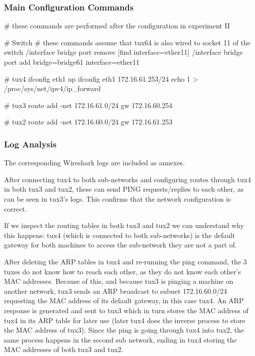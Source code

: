 \subsubsection{Main Configuration Commands}

\begin{code-bash}
# these commands are performed after the configuration in experiment II

# Switch
# these commands assume that tux64 is also wired to socket 11 of the switch
/interface bridge port remove [find interface=ether11]
/interface bridge port add bridge=bridge61 interface=ether11

# tux4
ifconfig eth1 up
ifconfig eth1 172.16.61.253/24
echo 1 > /proc/sys/net/ipv4/ip_forward

# tux3
route add -net 172.16.61.0/24 gw 172.16.60.254

# tux2
route add -net 172.16.60.0/24 gw 172.16.61.253
\end{code-bash}

\subsubsection{Log Analysis}

The corresponding Wireshark logs are included as annexes.

After connecting tux4 to both sub-networks and configuring routes through tux4 in both tux3 and tux2, these can send PING requests/replies to each other, as can be seen in tux3's logs. This confirms that the network configuration is correct.

If we inspect the routing tables in both tux3 and tux2 we can understand why this happens: tux4 (which is connected to both sub-networks) is the default gateway for both machines to access the sub-network they are not a part of.

After deleting the ARP tables in tux4 and re-running the ping command, the 3 tuxes do not know how to reach each other, as they do not know each other's MAC addresses.
Because of this, and because tux3 is pinging a machine on another network, tux3 sends an ARP broadcast to subnet 172.16.60.0/24 requesting the MAC address of its default gateway, in this case tux4.
An ARP response is generated and sent to tux3 which in turn stores the MAC address of tux4 in its ARP table for later use (later tux4 does the inverse process to store the MAC address of tux3).
Since the ping is going through tux4 into tux2, the same process happens in the second sub network, ending in tux4 storing the MAC addresses of both tux3 and tux2.

